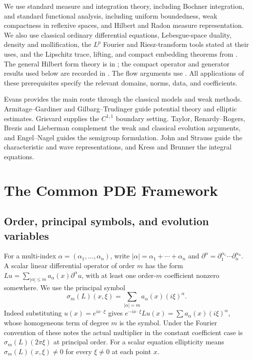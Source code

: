 \documentclass[11pt,oneside,openany]{book}
\theoremstyle{plain}
\theoremstyle{definition}
\theoremstyle{remark}
\begin{document}
We use standard measure and integration theory, including Bochner
integration, and standard functional analysis, including uniform
boundedness, weak compactness in reflexive spaces, and Hilbert and
Radon measure representation. We also use classical ordinary
differential equations, Lebesgue-space duality, density and
mollification, the \(L^p\) Fourier and Riesz-transform tools stated at
their uses, and the Lipschitz trace, lifting, and compact embedding
theorems from \cite{P102}. The general Hilbert form theory is in
\cite{P106}; the compact operator and generator results used below
are recorded in \cite{D16}. The flow arguments use \cite{D13}.
All applications of these prerequisites specify the relevant domains,
norms, data, and coefficients.

Evans provides the main route through the classical models and
weak methods. Armitage--Gardiner and Gilbarg--Trudinger guide
potential theory and elliptic estimates. Grisvard supplies the
\(C^{1,1}\) boundary setting. Taylor, Renardy--Rogers, Brezis and
Lieberman complement the weak and classical evolution arguments,
and Engel--Nagel guides the semigroup formulation. John and Strauss
guide the characteristic and wave representations, and Kress and
Brunner the integral equations.

\mainmatter
\chapter{The Common PDE Framework}
\label{chap:pde-common}

\section{Order, principal symbols, and evolution variables}
\label{pde:C01}

For a multi-index \(\alpha=(\alpha_1,\ldots,\alpha_n)\), write
\(|\alpha|=\alpha_1+\cdots+\alpha_n\) and
\(\partial^\alpha=\partial_1^{\alpha_1}\cdots\partial_n^{\alpha_n}\).
A scalar linear differential operator of order \(m\) has the form
\(Lu=\sum_{|\alpha|\le m}a_\alpha(x)\partial^\alpha u\), with at least
one order-\(m\) coefficient nonzero somewhere. We use the principal
symbol
\[
 \sigma_m(L)(x,\xi)=\sum_{|\alpha|=m}a_\alpha(x)(i\xi)^\alpha .
\]
Indeed substituting \(u(x)=e^{ix\cdot \xi}\) gives
\(e^{-ix\cdot\xi}Lu(x)=\sum a_\alpha(x)(i\xi)^\alpha\), whose
homogeneous term of degree \(m\) is the symbol. Under the Fourier
convention of these notes the actual multiplier in the constant
coefficient case is \(\sigma_m(L)(2\pi\xi)\) at principal order.
For a scalar equation ellipticity means \(\sigma_m(L)(x,\xi)\ne0\)
for every \(\xi\ne0\) at each point \(x\).
\end{document}
